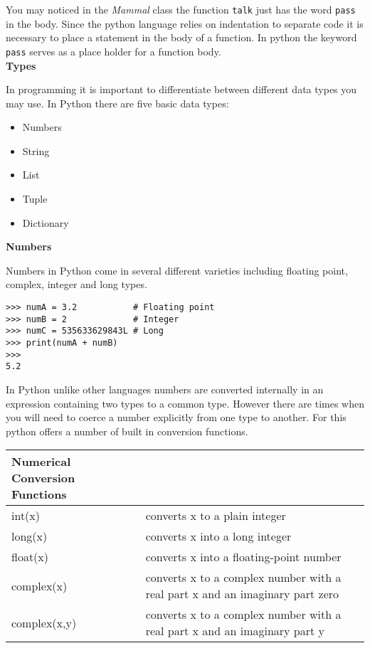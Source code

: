 \documentclass[letterpaper,11pt]{article}
\begin{document}
\par{You may noticed in the \textit{Mammal} class the function \texttt{talk}
    just has the word \texttt{pass} in the body. Since the python language relies
    on indentation to separate code it is necessary to place a statement in the
    body of a function. In python the keyword \texttt{pass} serves as a place
    holder for a function body.}
\\
\textbf{Types}
\par{In programming it is important to differentiate between different data
types you may use. In Python there are five basic data types: }
\begin{itemize}
    \setlength\itemsep{1pt}
    \item Numbers
    \item String
    \item List
    \item Tuple
    \item Dictionary
\end{itemize}
\textbf{Numbers}
\par{Numbers in Python come in several different varieties
including floating point, complex, integer and long types.}
\\
\begin{minipage}{.5\textwidth}
    \begin{tcolorbox}
        \begin{footnotesize}
            \begin{verbatim}
>>> numA = 3.2           # Floating point
>>> numB = 2             # Integer
>>> numC = 535633629843L # Long
>>> print(numA + numB)
>>>
5.2
            \end{verbatim}
        \end{footnotesize}
    \end{tcolorbox}
\end{minipage}
\par{In Python unlike other languages numbers are converted internally in an
expression containing two types to a common type. However there are times when
you will need to coerce a number explicitly from one type to another. For this
python offers a number of built in conversion functions.}
\\
\begin{tabular}[t]{l l}
    \textbf{Numerical Conversion Functions} &                                                   \\
    \hline
    int(x)       & converts x to a plain integer                                                \\
    long(x)      & converts x into a long integer                                               \\
    float(x)     & converts x into a floating-point number                                      \\
    complex(x)   & converts x to a complex number with a real part x and an imaginary part zero \\
    complex(x,y) & converts x to a complex number with a real part x and an imaginary part y    \\
\end{tabular}
\end{document}
